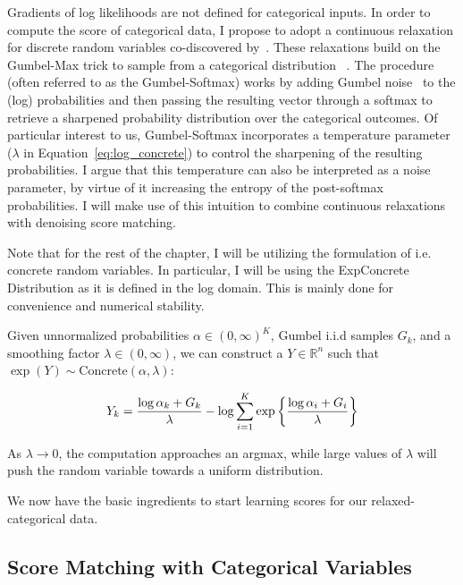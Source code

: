 Gradients of log likelihoods are not defined for categorical inputs. In order to compute the score of categorical data, I propose to adopt a continuous relaxation for discrete random variables co-discovered by~\cite{jang2017categorical, maddison2017concrete}. These relaxations build on the Gumbel-Max trick to sample from a categorical distribution ~\cite{maddison2014sampling}. The procedure (often referred to as the Gumbel-Softmax) works by adding Gumbel noise~\cite{gumbel1954statistical} to the (log) probabilities and then passing the resulting vector through a softmax to retrieve a sharpened probability distribution over the categorical outcomes. Of particular interest to us, Gumbel-Softmax incorporates a temperature parameter ($\lambda$ in Equation~\eqref{eq:log_concrete}) to control the sharpening of the resulting probabilities. I argue that this temperature can also be interpreted as a noise parameter, by virtue of it increasing the entropy of the post-softmax probabilities. I will make use of this intuition to combine continuous relaxations with denoising score matching. 

Note that for the rest of the chapter, I will be utilizing the formulation of \cite{maddison2017concrete} i.e. concrete random variables. In particular, I will be using the ExpConcrete Distribution as it is defined in the log domain. This is mainly done for convenience and numerical stability.

Given unnormalized probabilities $\alpha \in (0, \infty)^K$, Gumbel i.i.d samples $\mathit{G}_k$, and a smoothing factor $\lambda \in (0, \infty)$, we can construct a $Y \in \mathbb{R}^n$ such that $\exp(Y) \sim \text{Concrete}(\alpha, \lambda) $:

\begin{equation}
    Y_k = \frac{\log \alpha_k + G_k}{\lambda} - \log \sum_{i=1}^{K} \exp \left\{ {\frac{\log \alpha_i + G_i}{\lambda}} \right\}
    \label{eq:log_concrete}
\end{equation}

As $\lambda \rightarrow 0$, the computation approaches an argmax, while large values of $\lambda$ will push the random variable towards a uniform distribution.

We now have the basic ingredients to start learning scores for our relaxed-categorical data.

\subsection*{Score Matching with Categorical Variables}

